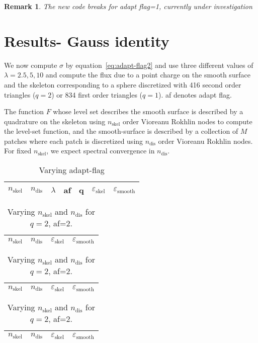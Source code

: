 \documentclass[11pt, oneside]{article}   	%
\newcommand\nskel{n_{\textrm{skel}}}
\newcommand\ndis{n_{\textrm{dis}}}
\newcommand\eskel{\varepsilon_{\textrm{skel}}}
\newcommand\esmooth{\varepsilon_{\textrm{smooth}}}
\newtheorem{remark}{Remark}
\begin{document}
\begin{remark}
The new code breaks for adapt flag=1, currently under investigation
\end{remark}

\section{Results- Gauss identity}
We now compute $\sigma$ by equation~\cref{eq:adapt-flag2} and
use three different values of $\lambda=2.5,5,10$ and compute
the flux due to a point charge on the smooth surface and the skeleton
corresponding to a sphere discretized with 416 second order triangles ($q=2$) 
or 834 first order triangles ($q=1$). af denotes adapt flag.

The function $F$ whose level set describes the smooth surface is 
described by a quadrature on the skeleton 
using $\nskel$ order Vioreanu Rokhlin nodes to compute the level-set function,
and the smooth-surface is described by a collection of $M$ patches
where each patch is discretized using $\ndis$ order Vioreanu Rokhlin nodes.
For fixed $\nskel$, we expect spectral convergence in $\ndis$.
\begin{table}[!ht]
\begin{center}
\begin{tabular}{|c|c|c|c|c|c|c|}
\hline
$\nskel$ & $\ndis$ & $\lambda$ & af & q & $\eskel$ & $\esmooth$ \\ \hline

\end{tabular}
\caption{Varying adapt-flag}
\end{center}
\end{table}

\begin{table}[!ht]
\begin{minipage}{.3\linewidth}
\caption{$\lambda = 2.5$}
\centering
{\tiny
\begin{tabular}{|c|c|c|c|}
\hline
$\nskel$ & $\ndis$ & $\eskel$ & $\esmooth$ \\ \hline

\end{tabular}
}
\end{minipage} \hspace{3ex} 
\begin{minipage}{.3\linewidth}
\caption{$\lambda = 5$}
\centering
{\tiny
\begin{tabular}{|c|c|c|c|}
\hline
$\nskel$ & $\ndis$ & $\eskel$ & $\esmooth$ \\ \hline

\end{tabular}
}
\end{minipage} \hspace{3ex}
\begin{minipage}{.3\linewidth}
\caption{$\lambda = 10$}
\centering
\centering
{\tiny
\begin{tabular}{|c|c|c|c|}
\hline
$\nskel$ & $\ndis$ & $\eskel$ & $\esmooth$ \\ \hline

\end{tabular}
}
\end{minipage}
\caption{Varying $\nskel$ and $\ndis$ for $q=2$, af=2.}
\end{table}
\end{document}
